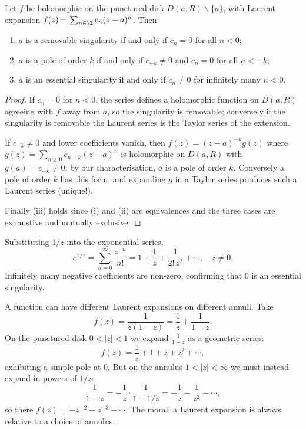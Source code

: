 \begin{proposition}
    Let $f$ be holomorphic on the punctured disk $D(a, R) \backslash \{a\}$, with Laurent expansion $f(z) = \sum_{n \in \Z} c_n(z - a)^n$. Then:
    \begin{enumerate}[label=(\roman*)]
        \item $a$ is a removable singularity if and only if $c_n = 0$ for all $n < 0$;
        \item $a$ is a pole of order $k$ if and only if $c_{-k} \neq 0$ and $c_n = 0$ for all $n < -k$;
        \item $a$ is an essential singularity if and only if $c_n \neq 0$ for infinitely many $n < 0$.
    \end{enumerate}
\end{proposition}
\begin{proof}
    If $c_n = 0$ for $n < 0$, the series defines a holomorphic function on $D(a, R)$ agreeing with $f$ away from $a$, so the singularity is removable; conversely if the singularity is removable the Laurent series is the Taylor series of the extension.

    If $c_{-k} \neq 0$ and lower coefficients vanish, then $f(z) = (z - a)^{-k}g(z)$ where $g(z) = \sum_{n \geq 0} c_{n - k}(z - a)^{n}$ is holomorphic on $D(a, R)$ with $g(a) = c_{-k} \neq 0$; by our characterisation, $a$ is a pole of order $k$. Conversely a pole of order $k$ has this form, and expanding $g$ in a Taylor series produces such a Laurent series (unique!).

    Finally (iii) holds since (i) and (ii) are equivalences and the three cases are exhaustive and mutually exclusive.
\end{proof}

\begin{example}
    Substituting $1/z$ into the exponential series,
    $$
    e^{1/z} = \sum_{n = 0}^{\infty} \frac{z^{-n}}{n!} = 1 + \frac{1}{z} + \frac{1}{2! \, z^2} + \cdots, \quad z \neq 0.
    $$
    Infinitely many negative coefficients are non-zero, confirming that $0$ is an essential singularity.
\end{example}

\begin{example}
    A function can have different Laurent expansions on different annuli. Take
    $$
    f(z) = \frac{1}{z(1 - z)} = \frac{1}{z} + \frac{1}{1 - z}.
    $$
    On the punctured disk $0 < |z| < 1$ we expand $\frac{1}{1 - z}$ as a geometric series:
    $$
    f(z) = \frac{1}{z} + 1 + z + z^2 + \cdots,
    $$
    exhibiting a simple pole at $0$. But on the annulus $1 < |z| < \infty$ we must instead expand in powers of $1/z$:
    $$
    \frac{1}{1 - z} = -\frac{1}{z} \cdot \frac{1}{1 - 1/z} = -\frac{1}{z} - \frac{1}{z^2} - \cdots,
    $$
    so there $f(z) = -z^{-2} - z^{-3} - \cdots$. The moral: a Laurent expansion is always relative to a choice of annulus.
\end{example}

